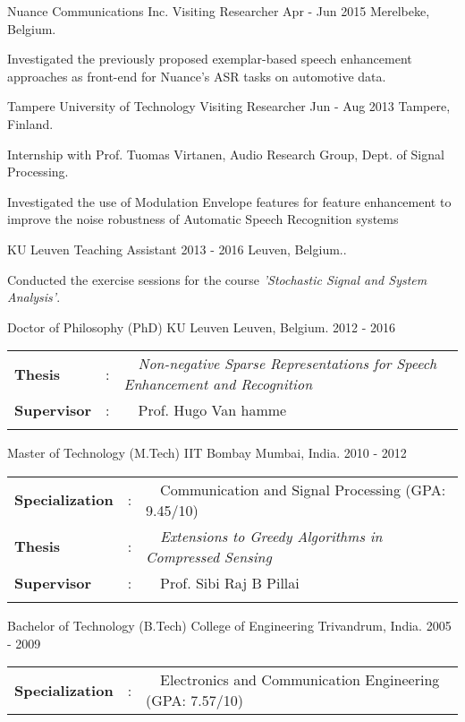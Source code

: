 \documentclass[]{awesome-cv}
\begin{document}
\begin{cventries}
{\begin{cvitems}
		\end{cvitems}}
	\cventry
	{Nuance Communications Inc.}
	{Visiting Researcher}
	{Apr - Jun 2015}
	{Merelbeke, Belgium.}
	{\begin{cvitems}
		\item {Investigated the previously proposed exemplar-based speech enhancement approaches as front-end for Nuance's ASR tasks on automotive data.}
		\end{cvitems}}
	\cventry
	{Tampere University of Technology}
	{Visiting Researcher}
	{Jun - Aug 2013}
	{Tampere, Finland.}
	{\begin{cvitems}
		\item {Internship with Prof. Tuomas Virtanen, Audio Research Group, Dept. of Signal Processing.}
		\item {Investigated the use of Modulation Envelope features for feature enhancement to improve the noise robustness of Automatic Speech Recognition systems}
	\end{cvitems}}
	\cventry
	{KU Leuven}
	{Teaching Assistant}
	{2013 - 2016}
	{Leuven, Belgium..}
	{\begin{cvitems}
		\item {Conducted the exercise sessions for the course \emph{'Stochastic Signal and System Analysis'}.}
	\end{cvitems}}
\end{cventries}
\begin{cventries}
	\cventry
	{Doctor of Philosophy (PhD)}
	{KU Leuven}
	{Leuven, Belgium.}
        {2012 - 2016}
	{\begin{tabular}{l c l}
		\textbf{Thesis} & : & ~~\textit{Non-negative Sparse Representations for Speech Enhancement and Recognition}\\
		\textbf{Supervisor} & : & ~~Prof. Hugo Van hamme \\
		& & \\
	 \end{tabular}
	}
	\cventry
	{Master of Technology (M.Tech)}
	{IIT Bombay}
	{Mumbai, India.}
	{2010 - 2012}
	{\begin{tabular}{l c l}
		\textbf{Specialization} & : & ~~Communication and Signal Processing (GPA: 9.45/10) \\
		\textbf{Thesis} & : & ~~\textit{Extensions to Greedy Algorithms in Compressed Sensing}\\
		\textbf{Supervisor} & : & ~~Prof. Sibi Raj B Pillai \\
		& & \\
	 \end{tabular}
	}
	\cventry
	{Bachelor of Technology (B.Tech)}
	{College of Engineering}
	{Trivandrum, India.}
	{2005 - 2009}
	{\begin{tabular}{l c l}
		\textbf{Specialization} & : & ~~Electronics and Communication Engineering (GPA: 7.57/10) \\
	 \end{tabular}
	}
\end{cventries}
\end{document}
